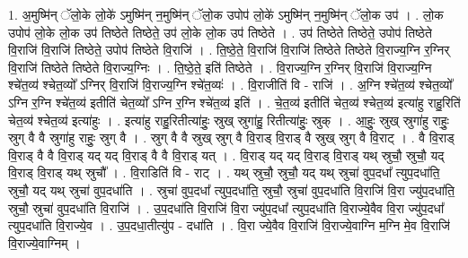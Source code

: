 \documentclass[17pt]{extarticle}
\begin{document}
1. अ॒मुष्मि॑न् ॅलो॒के लो॒के॑ ऽमुष्मि॑न् न॒मुष्मि॑न् ॅलो॒क उपोप॑ लो॒के॑ ऽमुष्मि॑न् न॒मुष्मि॑न् ॅलो॒क उप॑ । . लो॒क उपोप॑ लो॒के लो॒क उप॑ तिष्ठेते तिष्ठेते॒ उप॑ लो॒के लो॒क उप॑ तिष्ठेते । . उप॑ तिष्ठेते तिष्ठेते॒ उपोप॑ तिष्ठेते वि॒राजि॑ वि॒राजि॑ तिष्ठेते॒ उपोप॑ तिष्ठेते वि॒राजि॑ । . ति॒ष्ठे॒ते॒ वि॒राजि॑ वि॒राजि॑ तिष्ठेते तिष्ठेते वि॒राज्य॒ग्नि र॒ग्निर् वि॒राजि॑ तिष्ठेते तिष्ठेते वि॒राज्य॒ग्निः । . ति॒ष्ठे॒ते॒ इति॑ तिष्ठेते । . वि॒राज्य॒ग्नि र॒ग्निर् वि॒राजि॑ वि॒राज्य॒ग्नि श्चे॑त॒व्य॑ श्चेत॒व्यो᳚ ऽग्निर् वि॒राजि॑ वि॒राज्य॒ग्नि श्चे॑त॒व्यः॑ । . वि॒राजीति॑ वि - राजि॑ । . अ॒ग्नि श्चे॑त॒व्य॑ श्चेत॒व्यो᳚ ऽग्नि र॒ग्नि श्चे॑त॒व्य॑ इतीति॑ चेत॒व्यो᳚ ऽग्नि र॒ग्नि श्चे॑त॒व्य॑ इति॑ । . चे॒त॒व्य॑ इतीति॑ चेत॒व्य॑ श्चेत॒व्य॑ इत्या॑हु राहु॒रिति॑ चेत॒व्य॑ श्चेत॒व्य॑ इत्या॑हुः । . इत्या॑हु राहु॒रितीत्या॑हुः॒ स्रुख् स्रुगा॑हु॒ रितीत्या॑हुः॒ स्रुक् । . आ॒हुः॒ स्रुख् स्रुगा॑हु राहुः॒ स्रुग् वै वै स्रुगा॑हु राहुः॒ स्रुग् वै । . स्रुग् वै वै स्रुख् स्रुग् वै वि॒राड् वि॒राड् वै स्रुख् स्रुग् वै वि॒राट् । . वै वि॒राड् वि॒राड् वै वै वि॒राड् यद् यद् वि॒राड् वै वै वि॒राड् यत् । . वि॒राड् यद् यद् वि॒राड् वि॒राड् यथ् स्रुचौ॒ स्रुचौ॒ यद् वि॒राड् वि॒राड् यथ् स्रुचौ᳚ । . वि॒राडिति॑ वि - राट् । . यथ् स्रुचौ॒ स्रुचौ॒ यद् यथ् स्रुचा॑ वुप॒दधा᳚ त्युप॒दधा॑ति॒ स्रुचौ॒ यद् यथ् स्रुचा॑ वुप॒दधा॑ति । . स्रुचा॑ वुप॒दधा᳚ त्युप॒दधा॑ति॒ स्रुचौ॒ स्रुचा॑ वुप॒दधा॑ति वि॒राजि॑ वि॒रा ज्यु॑प॒दधा॑ति॒ स्रुचौ॒ स्रुचा॑ वुप॒दधा॑ति वि॒राजि॑ । . उ॒प॒दधा॑ति वि॒राजि॑ वि॒रा ज्यु॑प॒दधा᳚ त्युप॒दधा॑ति वि॒राज्ये॒वैव वि॒रा ज्यु॑प॒दधा᳚ त्युप॒दधा॑ति वि॒राज्ये॒व । . उ॒प॒दधा॒तीत्यु॑प - दधा॑ति । . वि॒रा ज्ये॒वैव वि॒राजि॑ वि॒राज्ये॒वाग्नि म॒ग्नि मे॒व वि॒राजि॑ वि॒राज्ये॒वाग्निम् । \newline
\end{document}
